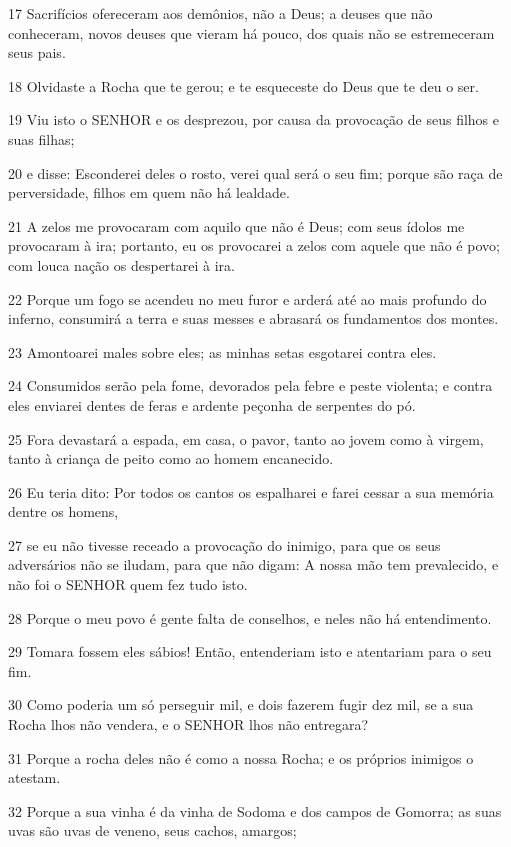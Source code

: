 \par 17 Sacrifícios ofereceram aos demônios, não a Deus; a deuses que não conheceram, novos deuses que vieram há pouco, dos quais não se estremeceram seus pais.
\par 18 Olvidaste a Rocha que te gerou; e te esqueceste do Deus que te deu o ser.
\par 19 Viu isto o SENHOR e os desprezou, por causa da provocação de seus filhos e suas filhas;
\par 20 e disse: Esconderei deles o rosto, verei qual será o seu fim; porque são raça de perversidade, filhos em quem não há lealdade.
\par 21 A zelos me provocaram com aquilo que não é Deus; com seus ídolos me provocaram à ira; portanto, eu os provocarei a zelos com aquele que não é povo; com louca nação os despertarei à ira.
\par 22 Porque um fogo se acendeu no meu furor e arderá até ao mais profundo do inferno, consumirá a terra e suas messes e abrasará os fundamentos dos montes.
\par 23 Amontoarei males sobre eles; as minhas setas esgotarei contra eles.
\par 24 Consumidos serão pela fome, devorados pela febre e peste violenta; e contra eles enviarei dentes de feras e ardente peçonha de serpentes do pó.
\par 25 Fora devastará a espada, em casa, o pavor, tanto ao jovem como à virgem, tanto à criança de peito como ao homem encanecido.
\par 26 Eu teria dito: Por todos os cantos os espalharei e farei cessar a sua memória dentre os homens,
\par 27 se eu não tivesse receado a provocação do inimigo, para que os seus adversários não se iludam, para que não digam: A nossa mão tem prevalecido, e não foi o SENHOR quem fez tudo isto.
\par 28 Porque o meu povo é gente falta de conselhos, e neles não há entendimento.
\par 29 Tomara fossem eles sábios! Então, entenderiam isto e atentariam para o seu fim.
\par 30 Como poderia um só perseguir mil, e dois fazerem fugir dez mil, se a sua Rocha lhos não vendera, e o SENHOR lhos não entregara?
\par 31 Porque a rocha deles não é como a nossa Rocha; e os próprios inimigos o atestam.
\par 32 Porque a sua vinha é da vinha de Sodoma e dos campos de Gomorra; as suas uvas são uvas de veneno, seus cachos, amargos;
